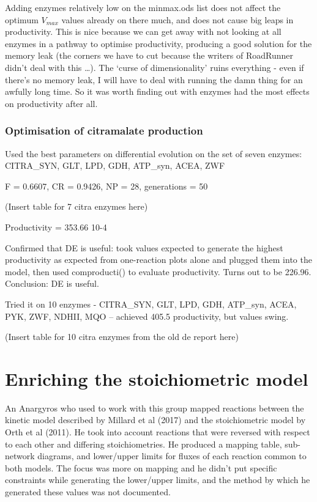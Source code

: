 \documentclass[parskip=full]{scrreprt}
\begin{document}
Adding enzymes relatively low on the minmax.ods list does not affect the optimum $V_{max}$ values already on there much, and does not cause big leaps in productivity. This is nice because we can get away with not looking at all enzymes in a pathway to optimise productivity, producing a good solution for the memory leak (the corners we have to cut because the writers of RoadRunner didn't deal with this \ldots). The `curse of dimensionality' ruins everything - even if there's no memory leak, I will have to deal with running the damn thing for an awfully long time. So it was worth finding out with enzymes had the most effects on productivity after all.

\subsection{Optimisation of citramalate production}
\label{ssec:optcitra}

Used the best parameters on differential evolution on the set of seven enzymes: CITRA\_SYN, GLT, LPD, GDH, ATP\_syn, ACEA, ZWF

F = 0.6607, CR = 0.9426, NP = 28, generations = 50

(Insert table for 7 citra enzymes here)

Productivity = 353.66 10-4

Confirmed that DE is useful: took values expected to generate the highest productivity as expected from one-reaction plots alone and plugged them into the model, then used comproducti() to evaluate productivity. Turns out to be 226.96. Conclusion: DE is useful.

Tried it on 10 enzymes - CITRA\_SYN, GLT, LPD, GDH, ATP\_syn, ACEA, PYK, ZWF, NDHII, MQO -- achieved 405.5 productivity, but values swing.

(Insert table for 10 citra enzymes from the old de report here)

\chapter{Enriching the stoichiometric model}
\label{ch:stoich}

An Anargyros who used to work with this group mapped reactions between the kinetic model described by Millard et al (2017) and the stoichiometric model by Orth et al (2011). He took into account reactions that were reversed with respect to each other and differing stoichiometries. He produced a mapping table, sub-network diagrams, and lower/upper limits for fluxes of each reaction common to both models. The focus was more on mapping and he didn’t put specific constraints while generating the lower/upper limits, and the method by which he generated these values was not documented.
\end{document}
